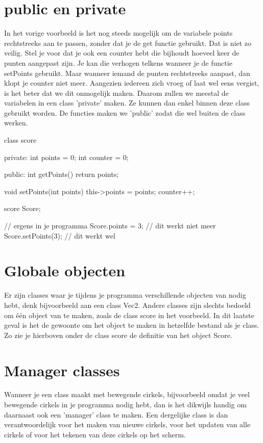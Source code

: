 \section{public en private}
In het vorige voorbeeld is het nog steeds mogelijk om de variabele points rechtstreeks aan te passen, zonder dat je de get functie gebruikt. Dat is niet zo veilig. Stel je voor dat je ook een counter hebt die bijhoudt hoeveel keer de punten aangepast zijn. Je kan die verhogen telkens wanneer je de functie setPoints gebruikt. Maar wanneer iemand de punten rechtstreeks aanpast, dan klopt je counter niet meer. Aangezien iedereen zich vroeg of laat wel eens vergist, is het beter dat we dit onmogelijk maken. Daarom zullen we meestal de variabelen in een class 'private' maken. Ze kunnen dan enkel binnen deze class gebruikt worden. De functies maken we 'public' zodat die wel buiten de class werken.

\begin{code}
class score {
private:
  int points  = 0;
  int counter = 0;
  
public:  
  int getPoints() {
    return points;
  }
  
  void setPoints(int points) {
    this->points = points;
    counter++;
  } 
}
score Score;

// ergens in je programma
Score.points = 3; // dit werkt niet meer
Score.setPoints(3); // dit werkt wel
\end{code}

\section{Globale objecten}
Er zijn classes waar je tijdens je programma verschillende objecten van nodig hebt, denk bijvoorbeeld aan een class Vec2. Andere classes zijn slechts bedoeld om \'e\'en object van te maken, zoals de class score in het voorbeeld. In dit laatste geval is het de gewoonte om het object te maken in hetzelfde bestand als je class. Zo zie je hierboven onder de class score de definitie van het object Score.

\section{Manager classes}
\label{section:managerClass}
Wanneer je een class maakt met bewegende cirkels, bijvoorbeeld omdat je veel bewegende cirkels in je programma nodig hebt, dan is het dikwijls handig om daarnaast ook een 'manager' class te maken. Een dergelijke class is dan verantwoordelijk voor het maken van nieuwe cirkels, voor het updaten van alle cirkels of voor het tekenen van deze cirkels op het scherm.

